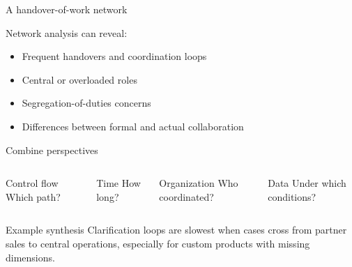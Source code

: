 \documentclass[aspectratio=169,11pt]{beamer}
\begin{document}
\begin{frame}{A handover-of-work network}
  \centering
  \vspace{0.45cm}
  Network analysis can reveal:
  \begin{itemize}
    \item Frequent handovers and coordination loops
    \item Central or overloaded roles
    \item Segregation-of-duties concerns
    \item Differences between formal and actual collaboration
  \end{itemize}
\end{frame}

\begin{frame}{Combine perspectives}
  \begin{columns}[T,onlytextwidth]
      \begin{block}{Control flow}
        Which path?
      \end{block}
      \begin{block}{Time}
        How long?
      \end{block}
      \begin{block}{Organization}
        Who coordinated?
      \end{block}
      \begin{block}{Data}
        Under which conditions?
      \end{block}
  \end{columns}
  \vspace{0.55cm}
  \begin{block}{Example synthesis}
    Clarification loops are slowest when cases cross from partner sales to
    central operations, especially for custom products with missing dimensions.
  \end{block}
\end{frame}
\end{document}
